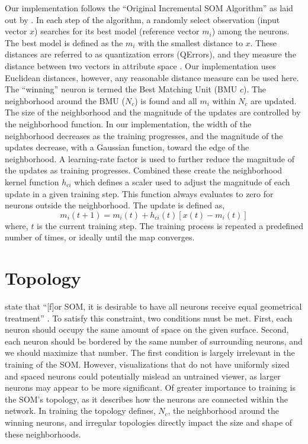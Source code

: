 Our implementation follows the ``Original Incremental SOM Algorithm'' as laid
out by \cite{Kohonen2000}.  In each step of the algorithm, a randomly select
observation (input vector $x$) searches for its best model (reference vector
$m_i$) among the neurons.  The best model is defined as the $m_i$ with the
smallest distance to $x$.  These distances are referred to as quantization
errors (QErrors), and they measure the distance between two vectors in
attribute space \citep{Kohonen2000}.  Our implementation uses Euclidean
distances, however, any reasonable distance measure can be used here.  The
``winning'' neuron is termed the Best Matching Unit (BMU $c$).  The
neighborhood around the BMU ($N_c$) is found and all $m_i$ within $N_c$ are
updated.  The size of the neighborhood and the magnitude of the updates are
controlled by the neighborhood function. In our implementation, the width of
the neighborhood decreases as the training progresses, and the magnitude of
the updates decrease, with a Gaussian function, toward the edge of the
neighborhood. A learning-rate factor is used to further reduce the magnitude
of the updates as training progresses.  Combined these create the neighborhood
kernel function $h_{ci}$ which defines a scaler used to adjust the magnitude
of each update in a given training step.  This function always evaluates to
zero for neurons outside the neighborhood.  The update is defined as,
\begin{equation}
  {m_i(t+1)} = m_i(t) +  h_{ci}(t)[x(t) - m_i(t)]
\label{update}
\end{equation}
where, $t$ is the current training step.  The training process is repeated a
predefined number of times, or ideally until the map converges.

\section{Topology}
\label{bg:topo}
\citeauthor{wu2006} state that ``[f]or SOM, it is desirable to have all
neurons receive equal geometrical treatment'' \cite[p. 900]{wu2006}.  To
satisfy this constraint, two conditions must be met.  First, each neuron
should occupy the same amount of space on the given surface.  Second, each
neuron should be bordered by the same number of surrounding neurons, and we
should maximize that number.  The first condition is largely irrelevant in the
training of the SOM.  However, visualizations that do not have uniformly sized
and spaced neurons could potentially mislead an untrained viewer, as larger
neurons may appear to be more significant. Of greater importance to
training is the SOM's topology, as it describes how the neurons are connected
within the network.  In training the topology defines, $N_c$, the neighborhood
around the winning neurons, and irregular topologies directly impact the size and
shape of these neighborhoods.  


